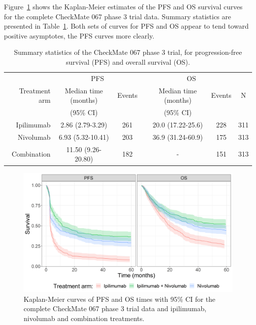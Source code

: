\documentclass[AMA,STIX1COL]{WileyNJD-v2}
\begin{document}
Figure~\ref{fig:S_raw_data} shows the Kaplan-Meier estimates of the PFS and OS survival curves for the complete CheckMate 067 phase 3 trial data.
Summary statistics are presented in Table~\ref{tab:checkmate_summary}.
Both sets of curves for PFS and OS appear to tend toward positive asymptotes, the PFS curves more clearly.


\begin{center}
\begin{table}[!ht]
\caption{Summary statistics of the CheckMate 067 phase 3 trial, for progression-free survival (PFS) and overall survival (OS). \label{tab:checkmate_summary}}
\centering
\begin{tabular}{r c c c c c c}
\toprule
\multicolumn{1}{l}{} & \multicolumn{2}{c}{PFS} & \multicolumn{1}{l}{} &\multicolumn{2}{c}{OS}\\
\cmidrule{2-3}\cmidrule{5-6}
 Treatment arm & Median time (months) & Events & & Median time (months) & Events & N\\
               & (95\% CI)            &        & & (95\% CI)            &        & \\
 \midrule
 Ipilimumab  & 2.86 (2.79-3.29)   & 261 & & 20.0 (17.22-25.6) & 228 & 311\\
 Nivolumab   & 6.93 (5.32-10.41)  & 203 & & 36.9 (31.24-60.9) & 175 & 313\\
 Combination & 11.50 (9.26-20.80) & 182 & & - & 151 & 313\\ 
\bottomrule
\end{tabular}
\end{table}
\end{center}

\begin{figure}[!ht]
\centering
\includegraphics[width=0.6\linewidth]{km_raw_data.png}
\caption{\label{fig:S_raw_data} Kaplan-Meier curves of PFS and OS times with 95\% CI for the complete CheckMate 067 phase 3 trial data and ipilimumab, nivolumab and combination treatments.}
\end{figure}
\end{document}
